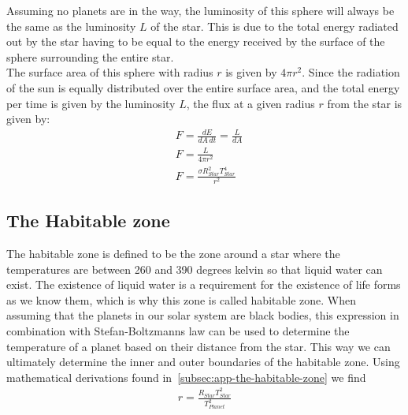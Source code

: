 \documentclass[reprint,english,notitlepage]{revtex4-2}
\begin{document}
Assuming no planets are in the way, the luminosity of this sphere will always be the same as the luminosity $L$ of the star.
This is due to the total energy radiated out by the star having to be equal to the energy received by the surface of the sphere surrounding the entire star.\\
The surface area of this sphere with radius $r$ is given by $4 \pi r^2$.
Since the radiation of the sun is equally distributed over the entire surface area, and the total energy per time is given by the luminosity $L$, the flux at a given radius $r$ from the star is given by:
\begin{align}
    &F = \frac{dE}{dA \, dt} = \frac{L}{dA}\\
	&F = \frac{L}{4 \pi r^2}\\
	&F = \frac{\sigma R_{Star}^2 T_{Star}^4}{r^2} \label{Flux_Distance}
\end{align}

\subsection{The Habitable zone}\label{subsec:temperature-of-planets}
The habitable zone is defined to be the zone around a star where the temperatures are between 260 and 390 degrees kelvin so that liquid water can exist.
The existence of liquid water is a requirement for the existence of life forms as we know them, which is why this zone is called habitable zone.
When assuming that the planets in our solar system are black bodies, this expression in combination with Stefan-Boltzmanns law can be used to determine the temperature of a planet based on their distance from the star.
This way we can ultimately determine the inner and outer boundaries of the habitable zone.
Using mathematical derivations found in~\ref{subsec:app-the-habitable-zone} we find
\begin{align}
	r = \frac{R_{Star} T_{Star}^2}{T_{Planet}^2} \label{Radius_temp}
\end{align}
\end{document}
